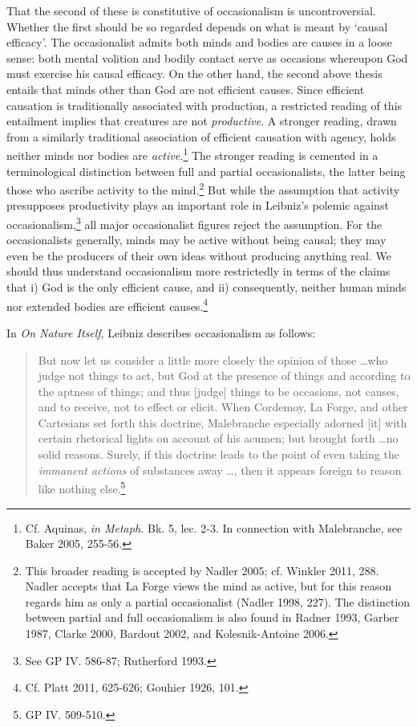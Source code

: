 \documentclass{article}
\begin{document}
That the second of these is constitutive of occasionalism is
uncontroversial. Whether the first should be so regarded depends on what
is meant by `causal efficacy'. The occasionalist admits both minds and
bodies are causes in a loose sense: both mental volition and bodily
contact serve as occasions whereupon God must exercise his causal
efficacy. On the other hand, the second above thesis entails that minds
other than God are not efficient causes. Since efficient causation is
traditionally associated with production, a restricted reading of this
entailment implies that creatures are not \emph{productive}. A stronger
reading, drawn from a similarly traditional association of efficient
causation with agency, holds neither minds nor bodies are
\emph{active.}\footnote{Cf. Aquinas, \emph{in Metaph.} Bk. 5, lec. 2-3.
  In connection with Malebranche, see Baker 2005, 255-56.} The stronger
reading is cemented in a terminological distinction between full and
partial occasionalists, the latter being those who ascribe activity to
the mind.\footnote{This broader reading is accepted by Nadler 2005; cf.
  Winkler 2011, 288. Nadler accepts that La Forge views the mind as
  active, but for this reason regards him as only a partial
  occasionalist (Nadler 1998, 227). The distinction between partial and
  full occasionalism is also found in Radner 1993, Garber 1987, Clarke
  2000, Bardout 2002, and Kolesnik-Antoine 2006.} But while the
assumption that activity presupposes productivity plays an important
role in Leibniz's polemic against occasionalism,\footnote{See GP IV.
  586-87; Rutherford 1993.} all major occasionalist figures reject the
assumption. For the occasionalists generally, minds may be active
without being causal; they may even be the producers of their own ideas
without producing anything real. We should thus understand occasionalism
more restrictedly in terms of the claims that i) God is the only
efficient cause, and ii) consequently, neither human minds nor extended
bodies are efficient causes.\footnote{Cf. Platt 2011, 625-626; Gouhier
  1926, 101.}

In \emph{On Nature Itself}, Leibniz describes occasionalism as follows:

\begin{quote}
But now let us consider a little more closely the opinion of those
\ldots who judge not things to act, but God at the presence of
things and according to the aptness of things; and thus {[}judge{]}
things to be occasions, not causes, and to receive, not to effect or
elicit. When Cordemoy, La Forge, and other Cartesians set forth this
doctrine, Malebranche especially adorned {[}it{]} with certain
rhetorical lights on account of his acumen; but brought forth
\ldots no solid reasons. Surely, if this doctrine leads to the
point of even taking the \emph{immanent actions} of substances away
\ldots, then it appears foreign to reason like nothing
else.\footnote{GP IV. 509-510.}
\end{quote}
\end{document}
